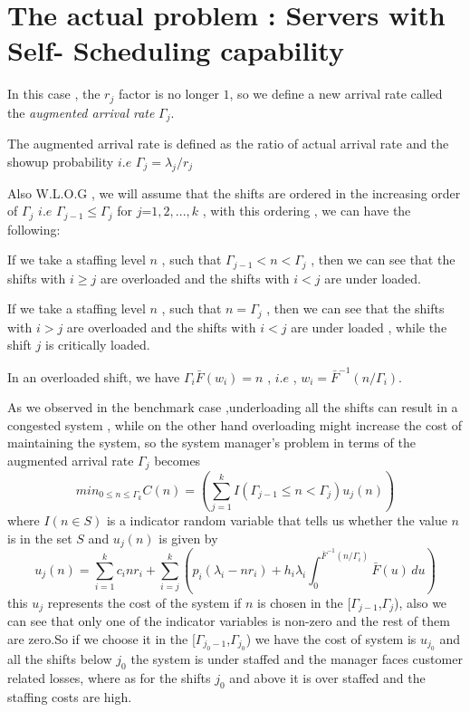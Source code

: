  \section{The actual problem : Servers with Self- Scheduling capability}
 In this case , the $r_j$ factor is no longer $1$, so we define a new arrival rate called the \textit{augmented arrival rate} $\Gamma_j$.
 \begin{definition} \label{}
 The augmented arrival rate is defined as the ratio of actual arrival rate and the showup probability $i.e$ $\Gamma_j = \lambda_j/r_j$
 \end{definition}
 Also W.L.O.G , we will assume that the shifts are ordered in the increasing order of $\Gamma_j$
 $i.e$ $\Gamma_{j-1} \leq \Gamma_{j}$ for $j$={$1,2,...,k$} , with this ordering , we can have the following: 
 \begin{remark}
 If we take a staffing level $n$ , such that $\Gamma_{j-1} < n < \Gamma_{j}$ , then we can see that the shifts with $i \geq j$ are overloaded and the shifts with $i < j$ are under loaded.
 \end{remark}
 \begin{remark}
 If we take a staffing level $n$ , such that $n =\Gamma_{j}$ , then we can see that the shifts with $i > j$ are overloaded and the shifts with $i < j$ are under loaded , while the shift $j$ is critically loaded.
 \end{remark}
 \begin{remark}
 In an overloaded shift, we have $\Gamma_i \bar{F}(w_i) =n$ , $i.e$ , $w_i = \bar{F}^{-1}(n/\Gamma_i)$.
 \end{remark}
As we observed in the benchmark case ,underloading all the shifts can result in a congested system ,  while on the other hand overloading might increase the cost of maintaining the system, so the system manager's problem in terms of the augmented arrival rate $\Gamma_j$ becomes 
\begin{equation}
      min_{0 \leq n \leq \Gamma_k} C(n) = \left( \sum_{j=1}^{k} {I(\Gamma_{j-1}\leq n <\Gamma_j)u_j(n)}\right)
\end{equation}
where $I(n \in S)$ is a indicator random variable that tells us whether the value $n$ is in the set $S$ and $u_j(n)$ is given by 
\begin{equation}
u_j(n)=\sum_{i=1}^{k}{c_inr_i}+\sum_{i=j}^{k}{\left ( p_i( \lambda_i-nr_i)+ h_i\lambda_i \int_{0}^{\bar{F}^{-1}(n/\Gamma_i)}  \bar{F}(u)  \, du \right)}
\end{equation}
this $u_j$ represents the cost of the system if $n$ is chosen in the [$\Gamma_{j-1}$,$\Gamma_j$), also we can see that only one of the indicator variables is non-zero and the rest of them are zero.So if we choose it in the [$\Gamma_{j_{0}-1}$,$\Gamma_{j_0}$) we have the cost of system is $u_{j_0}$ and all the shifts below $j_0$ the system is under staffed and the manager faces customer related losses, where as for the shifts $j_0$ and above it is over staffed and the staffing costs are high.
